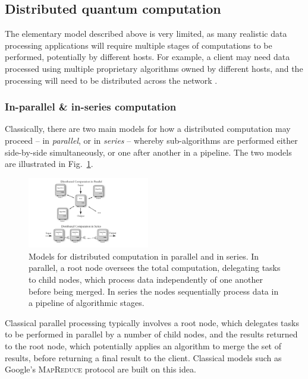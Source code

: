 %
%

\subsection{Distributed quantum computation} \label{sec:dist_QC} 

The elementary model described above is very limited, as many realistic data processing applications will require multiple stages of computations to be performed, potentially by different hosts. For example, a client may need data processed using multiple proprietary algorithms owned by different hosts, and the processing will need to be distributed across the network \cite{bib:Cirac99}.

\subsubsection{In-parallel \& in-series computation}

Classically, there are two main models for how a distributed computation may proceed -- in \textit{parallel}, or in \textit{series} -- whereby sub-algorithms are performed either side-by-side simultaneously, or one after another in a pipeline. The two models are illustrated in Fig.~\ref{fig:distributed}.

\begin{figure}[!htbp]
\includegraphics[clip=true, width=0.475\textwidth]{distributed}
\captionspacefig \caption{Models for distributed computation in parallel and in series. In parallel, a root node oversees the total computation, delegating tasks to child nodes, which process data independently of one another before being merged. In series the nodes sequentially process data in a pipeline of algorithmic stages.} \label{fig:distributed}
\end{figure}

Classical parallel processing typically involves a root node, which delegates tasks to be performed in parallel by a number of child nodes, and the results returned to the root node, which potentially applies an algorithm to merge the set of results, before returning a final result to the client. Classical models such as Google's \textsc{MapReduce} protocol \cite{bib:MapReduce} are built on this idea.

